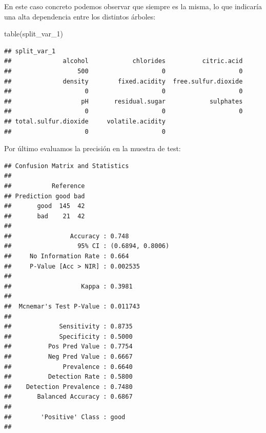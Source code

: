 \documentclass[
]{book}
\newenvironment{Shaded}{\begin{snugshade}}{\end{snugshade}}
\newcommand{\AttributeTok}[1]{\textcolor[rgb]{0.77,0.63,0.00}{#1}}
\newcommand{\FunctionTok}[1]{\textcolor[rgb]{0.00,0.00,0.00}{#1}}
\newcommand{\NormalTok}[1]{#1}
\newcommand{\OtherTok}[1]{\textcolor[rgb]{0.56,0.35,0.01}{#1}}
\newcommand{\SpecialCharTok}[1]{\textcolor[rgb]{0.00,0.00,0.00}{#1}}
\theoremstyle{break}
\theoremstyle{definition}
\theoremstyle{definition}
\theoremstyle{definition}
\theoremstyle{definition}
\theoremstyle{remark}
\begin{document}
En este caso concreto podemos observar que siempre es la misma, lo que indicaría una alta dependencia entre los distintos árboles:

\begin{Shaded}
\begin{Highlighting}[]
\FunctionTok{table}\NormalTok{(split\_var\_1)}
\end{Highlighting}
\end{Shaded}

\begin{verbatim}
## split_var_1
##              alcohol            chlorides          citric.acid 
##                  500                    0                    0 
##              density        fixed.acidity  free.sulfur.dioxide 
##                    0                    0                    0 
##                   pH       residual.sugar            sulphates 
##                    0                    0                    0 
## total.sulfur.dioxide     volatile.acidity 
##                    0                    0
\end{verbatim}

Por último evaluamos la precisión en la muestra de test:

\begin{Shaded}
\end{Shaded}

\begin{verbatim}
## Confusion Matrix and Statistics
## 
##           Reference
## Prediction good bad
##       good  145  42
##       bad    21  42
##                                           
##                Accuracy : 0.748           
##                  95% CI : (0.6894, 0.8006)
##     No Information Rate : 0.664           
##     P-Value [Acc > NIR] : 0.002535        
##                                           
##                   Kappa : 0.3981          
##                                           
##  Mcnemar's Test P-Value : 0.011743        
##                                           
##             Sensitivity : 0.8735          
##             Specificity : 0.5000          
##          Pos Pred Value : 0.7754          
##          Neg Pred Value : 0.6667          
##              Prevalence : 0.6640          
##          Detection Rate : 0.5800          
##    Detection Prevalence : 0.7480          
##       Balanced Accuracy : 0.6867          
##                                           
##        'Positive' Class : good            
## 
\end{verbatim}
\end{document}

